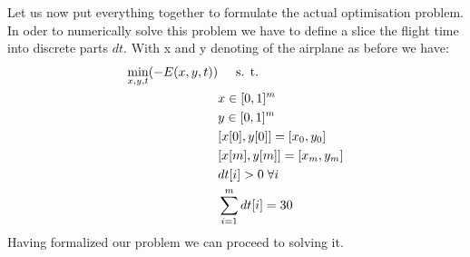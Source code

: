 Let us now put everything together to formulate the actual optimisation problem. In oder to numerically solve this problem we have to define a slice the flight time into discrete parts $dt$. With x and y denoting of the airplane as before we have:
\begin{align}
\min_{x,y,t }( -E(x,y,t)) & \hspace{5mm} \text{s. t. } \\
& x \in [0,1]^m\\
& y \in [0,1]^m\\
& [x[0],y[0]] = [x_0,y_0] \\
& [x[m],y[m]] = [x_m,y_m] \\
& dt[i] > 0 \; \forall i\\
& \sum_{i=1}^m dt[i] = 30 
\end{align}
Having formalized our problem we can proceed to solving it.

